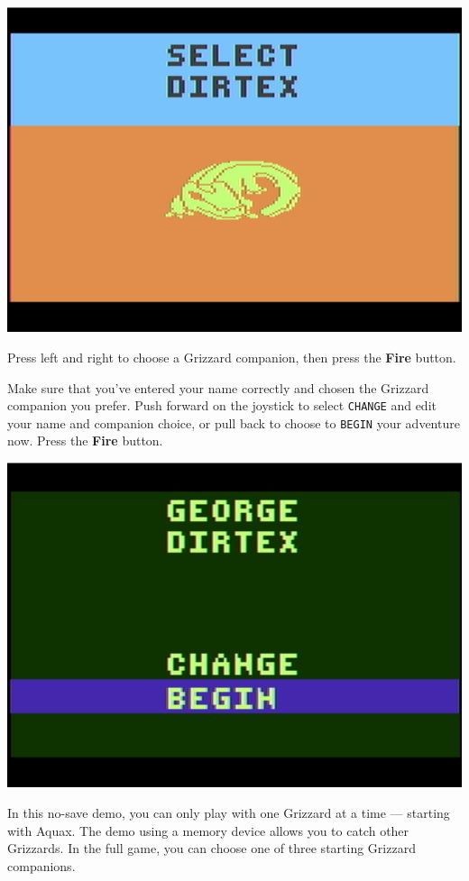 \documentclass[9pt,twocolumn,openany,article]{memoir}
\begin{document}
\begin{center}
  \includegraphics[width=.75\columnwidth]{../Manual/GrizzardChooserNTSC.png}
\end{center}

Press left  and right  to choose  a Grizzard  companion, then  press the
\textbf{Fire} button.

Make  sure  that you've  entered  your  name  correctly and  chosen  the
Grizzard companion  you prefer. Push  forward on the joystick  to select
\texttt{CHANGE} and edit your name and companion choice, or pull back to
choose    to   \texttt{BEGIN}    your   adventure    now.   Press    the
\textbf{Fire} button.

\begin{center}
  \includegraphics[width=.75\columnwidth]{../Manual/ConfirmNewGameNTSC.png}
\end{center}

\fi
\fi
\ifdefined\NOSAVE

In this no-save demo, you can only  play with one Grizzard at a time ---
starting with Aquax. The demo using  a memory device allows you to catch
other Grizzards. In the full game,  you can choose one of three starting
Grizzard companions.
\end{document}
